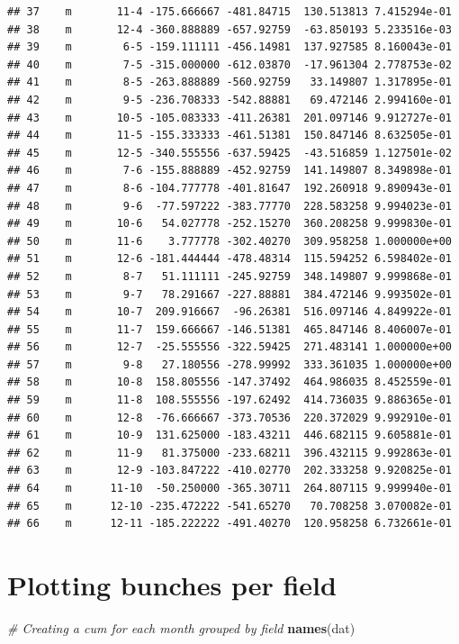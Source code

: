\documentclass[]{book}
\newenvironment{Shaded}{\begin{snugshade}}{\end{snugshade}}
\newcommand{\KeywordTok}[1]{\textcolor[rgb]{0.13,0.29,0.53}{\textbf{{#1}}}}
\newcommand{\CommentTok}[1]{\textcolor[rgb]{0.56,0.35,0.01}{\textit{{#1}}}}
\newcommand{\NormalTok}[1]{{#1}}
\theoremstyle{definition}
\theoremstyle{definition}
\theoremstyle{remark}
\begin{document}
\begin{verbatim}
## 37    m       11-4 -175.666667 -481.84715  130.513813 7.415294e-01
## 38    m       12-4 -360.888889 -657.92759  -63.850193 5.233516e-03
## 39    m        6-5 -159.111111 -456.14981  137.927585 8.160043e-01
## 40    m        7-5 -315.000000 -612.03870  -17.961304 2.778753e-02
## 41    m        8-5 -263.888889 -560.92759   33.149807 1.317895e-01
## 42    m        9-5 -236.708333 -542.88881   69.472146 2.994160e-01
## 43    m       10-5 -105.083333 -411.26381  201.097146 9.912727e-01
## 44    m       11-5 -155.333333 -461.51381  150.847146 8.632505e-01
## 45    m       12-5 -340.555556 -637.59425  -43.516859 1.127501e-02
## 46    m        7-6 -155.888889 -452.92759  141.149807 8.349898e-01
## 47    m        8-6 -104.777778 -401.81647  192.260918 9.890943e-01
## 48    m        9-6  -77.597222 -383.77770  228.583258 9.994023e-01
## 49    m       10-6   54.027778 -252.15270  360.208258 9.999830e-01
## 50    m       11-6    3.777778 -302.40270  309.958258 1.000000e+00
## 51    m       12-6 -181.444444 -478.48314  115.594252 6.598402e-01
## 52    m        8-7   51.111111 -245.92759  348.149807 9.999868e-01
## 53    m        9-7   78.291667 -227.88881  384.472146 9.993502e-01
## 54    m       10-7  209.916667  -96.26381  516.097146 4.849922e-01
## 55    m       11-7  159.666667 -146.51381  465.847146 8.406007e-01
## 56    m       12-7  -25.555556 -322.59425  271.483141 1.000000e+00
## 57    m        9-8   27.180556 -278.99992  333.361035 1.000000e+00
## 58    m       10-8  158.805556 -147.37492  464.986035 8.452559e-01
## 59    m       11-8  108.555556 -197.62492  414.736035 9.886365e-01
## 60    m       12-8  -76.666667 -373.70536  220.372029 9.992910e-01
## 61    m       10-9  131.625000 -183.43211  446.682115 9.605881e-01
## 62    m       11-9   81.375000 -233.68211  396.432115 9.992863e-01
## 63    m       12-9 -103.847222 -410.02770  202.333258 9.920825e-01
## 64    m      11-10  -50.250000 -365.30711  264.807115 9.999940e-01
## 65    m      12-10 -235.472222 -541.65270   70.708258 3.070082e-01
## 66    m      12-11 -185.222222 -491.40270  120.958258 6.732661e-01
\end{verbatim}

\section{Plotting bunches per field}\label{plotting-bunches-per-field}

\begin{Shaded}
\begin{Highlighting}[]
\CommentTok{# Creating a cum for each month grouped by field}
\KeywordTok{names}\NormalTok{(dat)}
\end{Highlighting}
\end{Shaded}
\end{document}
